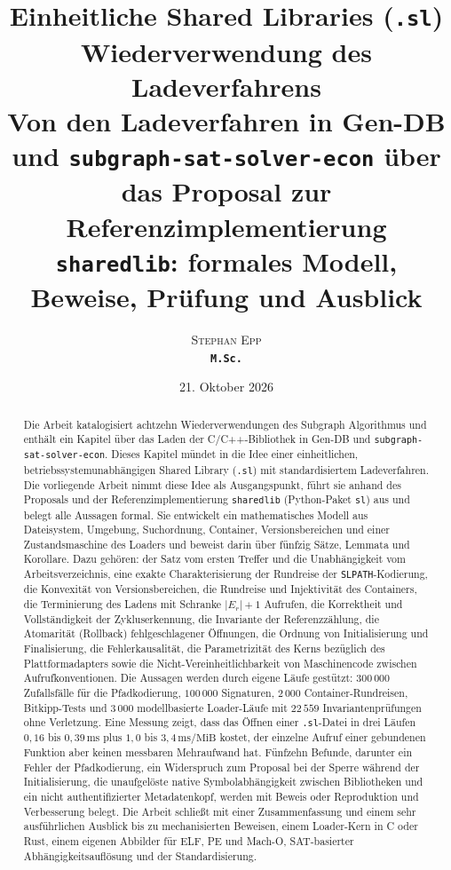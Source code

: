 \documentclass[a4paper,12pt,twoside]{report}
\title{\textbf{Einheitliche Shared Libraries (\texttt{.sl})\\Wiederverwendung des Ladeverfahrens}\\[0.4em]
	\large Von den Ladeverfahren in Gen-DB und \texttt{subgraph-sat-solver-econ} über das Proposal zur Referenzimplementierung \texttt{sharedlib}: formales Modell, Beweise, Prüfung und Ausblick}
\author{\textsc{Stephan Epp}\\ {\small \texttt{\textbf{M.Sc.}}}}
\date{21. Oktober 2026}
\DeclareRobustCommand{\_}{\ifmmode\mbox{\textunderscore}\else\textunderscore\allowbreak{}\fi}
\theoremstyle{definition}
\begin{document}
\maketitle

\begin{abstract}\noindent
	Die Arbeit \cite{epp2026csubgraph} katalogisiert achtzehn Wiederverwendungen des Subgraph Algorithmus und enthält ein Kapitel über das Laden der C/C++-Bibliothek in Gen-DB und \texttt{subgraph-sat-solver-econ}. Dieses Kapitel mündet in die Idee einer einheitlichen, betriebssystemunabhängigen Shared Library (\texttt{.sl}) mit standardisiertem Ladeverfahren. Die vorliegende Arbeit nimmt diese Idee als Ausgangspunkt, führt sie anhand des Proposals und der Referenzimplementierung \texttt{sharedlib} (Python-Paket \texttt{sl}) aus und belegt alle Aussagen formal. Sie entwickelt ein mathematisches Modell aus Dateisystem, Umgebung, Suchordnung, Container, Versionsbereichen und einer Zustandsmaschine des Loaders und beweist darin über fünfzig Sätze, Lemmata und Korollare. Dazu gehören: der Satz vom ersten Treffer und die Unabhängigkeit vom Arbeitsverzeichnis, eine exakte Charakterisierung der Rundreise der \texttt{SL\_PATH}-Kodierung, die Konvexität von Versionsbereichen, die Rundreise und Injektivität des Containers, die Terminierung des Ladens mit Schranke $|E_r|+1$ Aufrufen, die Korrektheit und Vollständigkeit der Zykluserkennung, die Invariante der Referenzzählung, die Atomarität (Rollback) fehlgeschlagener Öffnungen, die Ordnung von Initialisierung und Finalisierung, die Fehlerkausalität, die Parametrizität des Kerns bezüglich des Plattformadapters sowie die Nicht-Vereinheitlichbarkeit von Maschinencode zwischen Aufrufkonventionen. Die Aussagen werden durch eigene Läufe gestützt: $300\,000$ Zufallsfälle für die Pfadkodierung, $100\,000$ Signaturen, $2\,000$ Container-Rundreisen, Bitkipp-Tests und $3\,000$ modellbasierte Loader-Läufe mit $22\,559$ Invariantenprüfungen ohne Verletzung. Eine Messung zeigt, dass das Öffnen einer \texttt{.sl}-Datei in drei Läufen $0{,}16$ bis $0{,}39\,\mathrm{ms}$ plus $1{,}0$ bis $3{,}4\,\mathrm{ms}/\mathrm{MiB}$ kostet, der einzelne Aufruf einer gebundenen Funktion aber keinen messbaren Mehraufwand hat. Fünfzehn Befunde, darunter ein Fehler der Pfadkodierung, ein Widerspruch zum Proposal bei der Sperre während der Initialisierung, die unaufgelöste native Symbolabhängigkeit zwischen Bibliotheken und ein nicht authentifizierter Metadatenkopf, werden mit Beweis oder Reproduktion und Verbesserung belegt. Die Arbeit schließt mit einer Zusammenfassung und einem sehr ausführlichen Ausblick bis zu mechanisierten Beweisen, einem Loader-Kern in C oder Rust, einem eigenen Abbilder für ELF, PE und Mach-O, SAT-basierter Abhängigkeitsauflösung und der Standardisierung.
\end{abstract}
\end{document}
